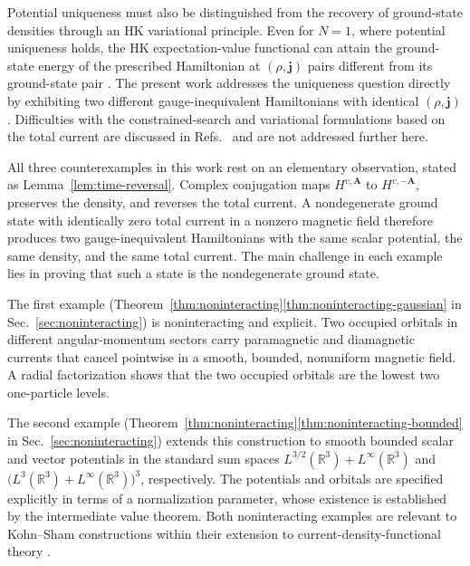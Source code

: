 \documentclass[11pt,a4paper]{article}
\theoremstyle{remark}
\theoremstyle{plain}
\newcommand{\R}{\mathbb R}
\newcommand{\jj}{\mathbf j}
\newcommand{\A}{\mathbf A}
\begin{document}
Potential uniqueness must also be distinguished from the
recovery of ground-state densities through an HK variational
principle. Even for $N=1$, where potential uniqueness holds,
the HK expectation-value functional can attain the ground-state
energy of the prescribed Hamiltonian at $(\rho,\jj)$ pairs
different from its ground-state pair \cite{LB2015}. 
The present work addresses the 
uniqueness question directly by exhibiting two different gauge-inequivalent Hamiltonians
with identical $(\rho,\jj)$. Difficulties with the constrained-search
and variational formulations based on the total current are discussed
in Refs.~\cite{Tellgren2012,VUC2013,LPT2021,Penz2023} and are not 
addressed further here.

All three counterexamples in this work rest on an 
elementary observation, stated as
Lemma~\ref{lem:time-reversal}. Complex conjugation maps $H^{v,\A}$ to
$H^{v,-\A}$, preserves the density, and reverses the total current. A
nondegenerate ground state with identically zero total current in a
nonzero magnetic field therefore produces two gauge-inequivalent
Hamiltonians with the same scalar potential, the same density, and the
same total current. The main challenge in each example lies in proving
that such a state is the nondegenerate ground state.

The first example (Theorem~\ref{thm:noninteracting}\ref{thm:noninteracting-gaussian} in
Sec.~\ref{sec:noninteracting}) is noninteracting
and explicit. Two occupied orbitals in different angular-momentum
sectors carry paramagnetic and diamagnetic currents that cancel
pointwise in a smooth, bounded, nonuniform magnetic field. 
A radial factorization shows that the two
occupied orbitals are the lowest two one-particle levels.

The second example (Theorem~\ref{thm:noninteracting}\ref{thm:noninteracting-bounded} in
Sec.~\ref{sec:noninteracting}) extends this construction
to smooth bounded scalar and vector potentials in the standard sum
spaces $L^{3/2}(\R^3)+L^\infty(\R^3)$ and
$\bigl(L^3(\R^3)+L^\infty(\R^3)\bigr)^3$, respectively.
The potentials and orbitals are specified explicitly in terms
of a normalization parameter, whose existence is established
by the intermediate value theorem. Both noninteracting examples are
relevant to Kohn--Sham constructions \cite{KS1965} within their
extension to current-density-functional theory \cite{VR1988}.
\end{document}

